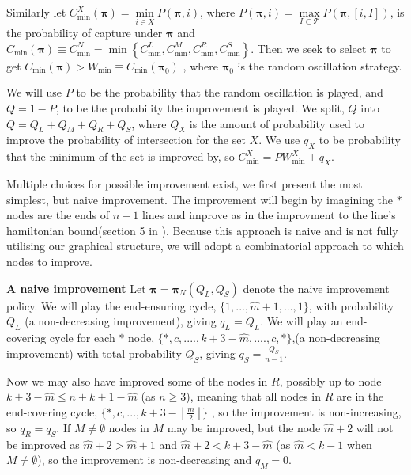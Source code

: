 \documentclass[a4paper,10pt]{article}
\newcommand{\floor}[1]{\left \lfloor #1 \right \rfloor}
\theoremstyle{definition}
\theoremstyle{definition}
\theoremstyle{remark}
\theoremstyle{definition}
\begin{document}
Similarly let $C_{\min}^{X} (\bm{\pi}) = \min\limits_{i \in X} P(\bm{\pi},i)$, where $P(\bm{\pi},i)=\max\limits_{ I \subset \mathcal{T}} P(\bm{\pi},[i,I])$, is the probability of capture under $\bm{\pi}$ and $C_{\min} (\bm{\pi}) \equiv C_{\min}^{N} = \min \left\{ C_{\min}^{L},  C_{\min}^{M},  C_{\min}^{R},  C_{\min}^{S} \right\}$. Then we seek to select $\bm{\pi}$ to get $C_{\min} (\bm{\pi}) > W_{\min} \equiv C_{\min}(\bm{\pi}_{0})$ , where $\bm{\pi}_{0}$ is the random oscillation strategy.

We will use $P$ to be the probability that the random oscillation is played, and $Q=1-P$, to be the probability the improvement is played. We split, $Q$ into $Q=Q_{L}+Q_{M}+Q_{R}+Q_{S}$, where $Q_{X}$ is the amount of probability used to improve the probability of intersection for the set $X$. We use $q_{X}$ to be probability that the minimum of the set is improved by, so $C_{\min}^{X}=PW_{\min}^{X}+q_{X}$.

Multiple choices for possible improvement exist, we first present the most simplest, but naive improvement. The improvement will begin by imagining the $*$ nodes are the ends of $n-1$ lines and improve as in the improvment to the line's hamiltonian bound(section 5 in \cite{Papadaki2016}). Because this approach is naive and is not fully utilising our graphical structure, we will adopt a combinatorial approach to which nodes to improve.

\textbf{A naive improvement}
Let $\bm{\pi}=\bm{\pi}_{N}(Q_{L},Q_{S})$ denote the naive improvement policy. We will play the end-ensuring cycle, $\{1,...,\hat{m}+1,...,1\}$, with probability $Q_{L}$ (a non-decreasing improvement), giving $q_{L}=Q_{L}$. We will play an end-covering cycle for each $*$ node, $\{*,c,....,k+3-\hat{m},....,c,* \}$,(a non-decreasing improvement) with total probability $Q_{S}$, giving $q_{S}=\frac{Q_{S}}{n-1}$.
 
Now we may also have improved some of the nodes in $R$, possibly up to node $k+3-\hat{m} \leq n+k+1-\hat{m}$ (as $n \geq 3$), meaning that all nodes in $R$ are in the end-covering cycle,   $\{*,c,...,k+3-\floor{\frac{m}{2}} \}$ , so the improvement is non-increasing, so $q_{R}=q_{S}$. If $M \neq \emptyset$ nodes in $M$ may be improved, but the node $\hat{m} +2$ will not be improved as  $\hat{m} +2 > \hat{m} +1$ and $\hat{m} +2 < k+3- \hat{m}$ (as $\hat{m} < k-1$ when $M \neq \emptyset$), so the improvement is non-decreasing and $q_{M}=0$.
\end{document}
